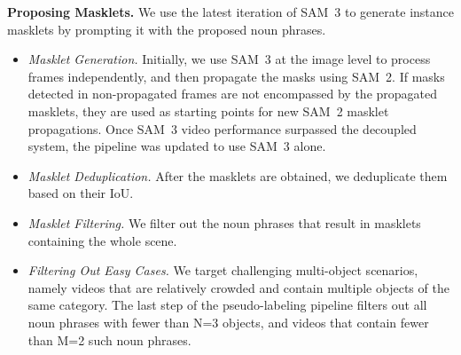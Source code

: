 \documentclass[]{fairmeta}
\newcommand{\samtwo}{SAM~2\xspace}
\newcommand{\model}{SAM~3\xspace}
\renewcommand{\paragraph}[1]{%
	\noindent\textbf{#1.}\noindent\xspace%
}
\begin{document}
\paragraph{Proposing Masklets} We use the latest iteration of \model to generate instance masklets by prompting it with the proposed noun phrases. 
\begin{itemize}
	\item \textit{Masklet Generation.} Initially, we use \model at the image level to process frames independently, and then propagate the masks using \samtwo. If masks detected in non-propagated frames are not encompassed by the propagated masklets, they are used as starting points for new \samtwo masklet propagations. Once \model video performance surpassed the decoupled system, the pipeline was updated to use \model alone.  
	\item \textit{Masklet Deduplication.} After the masklets are obtained, we deduplicate them based on their IoU.
	\item \textit{Masklet Filtering.} We filter out the noun phrases that result in masklets containing the whole scene.
	
	\item \textit{Filtering Out Easy Cases.}
	We target challenging multi-object scenarios, namely videos that are relatively crowded and contain multiple objects of the same category. The last step of the pseudo-labeling pipeline filters out all noun phrases with fewer than N=3 objects, and videos that contain fewer than M=2 such noun phrases.
\end{itemize}
\end{document}
